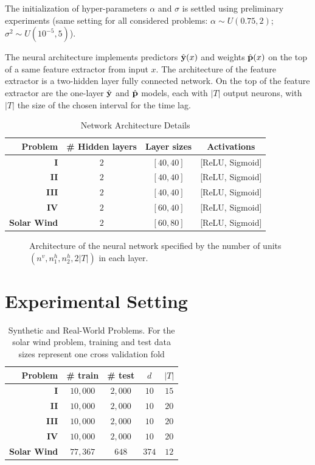 The initialization of hyper-parameters $\alpha$ and $\sigma$ is settled using preliminary 
experiments (same setting for all considered problems: 
$\alpha \sim U(0.75, 2)$; $\sigma^2 \sim U(10^{-5}, 5)$).

The neural architecture implements predictors $\hat {\bf y}(x)$ and weights $\hat {\bf p}(x)$ on 
the top of a same feature extractor from input $x$. The architecture of the feature extractor is a 
two-hidden layer fully connected network. On the top of the feature extractor are the 
one-layer $\hat {\bf y}$ and $\hat {\bf p}$ models, each with $|T|$ output neurons, with $|T|$ the 
size of the chosen interval for the time lag.

\begin{table}[htbp]
  \caption{Network Architecture Details}\label{tab:arch_probs}
  \centering
  \begin{tabular}{ r c c c }
  \hline
  Problem &  \# Hidden layers & Layer sizes & Activations\\
  \hline
  \textbf{I} & $2$ & $[40, 40]$  & [ReLU, Sigmoid]\\
  \textbf{II} & $2$ & $[40, 40]$ & [ReLU, Sigmoid]\\
  \textbf{III} & $2$ & $[40, 40]$ & [ReLU, Sigmoid]\\
  \textbf{IV} & $2$ & $[60, 40]$ & [ReLU, Sigmoid]\\
  \textbf{Solar Wind} & $2$ & $[60, 80]$ & [ReLU, Sigmoid]\\
  \hline
  \end{tabular}
\end{table}


\begin{figure}[ht]
\centerline{\resizebox*{0.7\textwidth}{!}{}}
\caption{\label{fig:archi} Architecture of the neural network specified by the number of units 
$(n^v,n_1^h,n_2^h,2\vert T\vert)$ in each layer.}
\label{fig:NN}
\end{figure}

\section{Experimental Setting}\label{sec:pdtExp}

\begin{table}[ht]
  \caption{
    Synthetic and Real-World Problems. 
    For the solar wind problem, training and test data sizes represent one cross validation fold}
  \label{tab:exp_data_info}
  \centering
  \begin{tabular}{ r c c c c}
  \hline
  Problem &  \# train & \# test & $d$ & $|T|$ \\
  \hline
  \textbf{I} & $10,000$ & $2,000$  & $10$ & $15$\\
  \textbf{II} & $10,000$ & $2,000$ & $10$ & $20$\\
  \textbf{III} & $10,000$ & $2,000$ & $10$ & $20$\\
  \textbf{IV} & $10,000$ & $2,000$ & $10$ & $20$\\
  \textbf{Solar Wind} & $77,367$ & $648$ & $374$ & $12$\\
  \hline
  \end{tabular}
\end{table}

